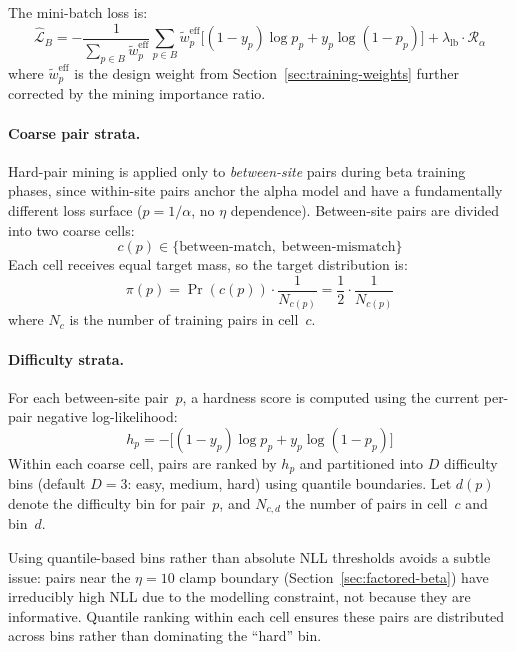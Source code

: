 \documentclass{article}
\begin{document}
The mini-batch loss is:
\begin{equation}
    \widehat{\mathcal{L}}_B
    =
    -\frac{1}{\sum_{p \in B} \tilde{w}_p^{\text{eff}}}
    \sum_{p \in B}
    \tilde{w}_p^{\text{eff}}
    \Big[(1-y_p)\log p_p + y_p \log(1-p_p)\Big]
    + \lambda_{\text{lb}} \cdot \mathcal{R}_\alpha
\end{equation}
where $\tilde{w}_p^{\text{eff}}$ is the design weight from Section~\ref{sec:training-weights} further corrected by the mining importance ratio.

\paragraph{Coarse pair strata.}
Hard-pair mining is applied only to \emph{between-site} pairs during beta training phases, since within-site pairs anchor the alpha model and have a fundamentally different loss surface ($p = 1/\alpha$, no $\eta$ dependence). Between-site pairs are divided into two coarse cells:
\[
c(p) \in \{\text{between-match},\; \text{between-mismatch}\}
\]
Each cell receives equal target mass, so the target distribution is:
\begin{equation}
    \pi(p) = \Pr(c(p)) \cdot \frac{1}{N_{c(p)}} = \frac{1}{2} \cdot \frac{1}{N_{c(p)}}
\end{equation}
where $N_c$ is the number of training pairs in cell~$c$.

\paragraph{Difficulty strata.}
For each between-site pair~$p$, a hardness score is computed using the current per-pair negative log-likelihood:
\begin{equation}
    h_p = -\Big[(1-y_p)\log p_p + y_p \log(1-p_p)\Big]
\end{equation}
Within each coarse cell, pairs are ranked by $h_p$ and partitioned into $D$ difficulty bins (default $D = 3$: easy, medium, hard) using quantile boundaries. Let $d(p)$ denote the difficulty bin for pair~$p$, and $N_{c,d}$ the number of pairs in cell~$c$ and bin~$d$.

Using quantile-based bins rather than absolute NLL thresholds avoids a subtle issue: pairs near the $\eta = 10$ clamp boundary (Section~\ref{sec:factored-beta}) have irreducibly high NLL due to the modelling constraint, not because they are informative. Quantile ranking within each cell ensures these pairs are distributed across bins rather than dominating the ``hard'' bin.
\end{document}
